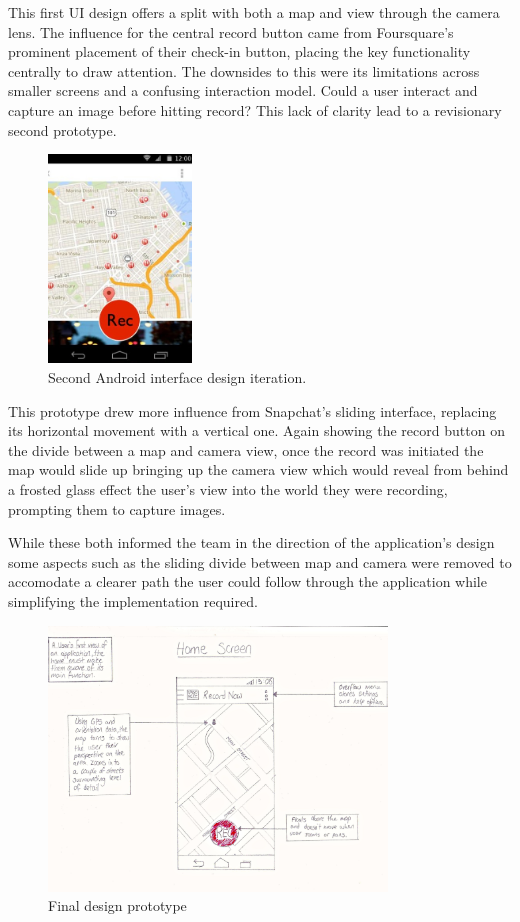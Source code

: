 \documentclass{l3proj}
\begin{document}
This first UI design offers a split with both a map and view through the camera
lens. The influence for the central record button came from Foursquare’s
prominent placement of their check-in button, placing the key functionality
centrally to draw attention. The downsides to this were its limitations across
smaller screens and a confusing interaction model. Could a user interact and
capture an image before hitting record? This lack of clarity lead to a
revisionary second prototype.

\begin{figure}[ht!]
\centering
\includegraphics[width=0.34\textwidth]{images/android-digital-prototype-2.jpg}
\caption{Second Android interface design iteration.}
\end{figure}

This prototype drew more influence from Snapchat’s sliding interface, replacing
its horizontal movement with a vertical one. Again showing the record button on
the divide between a map and camera view, once the record was initiated the map
would slide up bringing up the camera view which would reveal from behind a
frosted glass effect the user's view into the world they were recording,
prompting them to capture images.

While these both informed the team in the direction of the application's design some aspects such as the sliding divide between map and camera were removed to accomodate a clearer path the user could follow through the application while simplifying the implementation required.

\begin{figure}[ht!]
\centering
\includegraphics[width=90mm]{images/android-home-view.jpg}
\caption{Final design prototype}
\label{overflow}
\end{figure}
\end{document}
